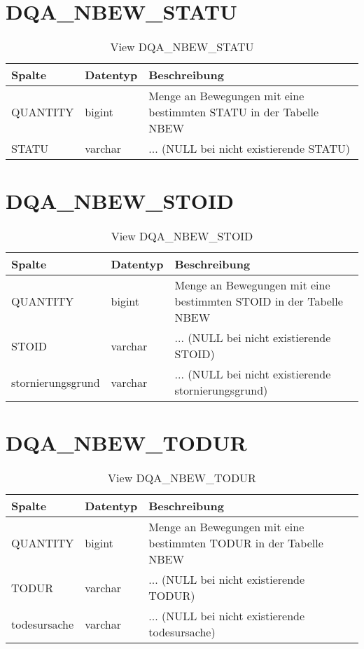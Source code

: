   \section{DQA\_NBEW\_STATU}

  \begin{table}[ht]
    \centering
    \caption{View DQA\_NBEW\_STATU}
    \label{tab:dqanbewstatu}
    \begin{tabular}{||l|l|p{10cm}||}
      \hline
      Spalte & Datentyp & Beschreibung \\ [0.5ex] \hline \hline
QUANTITY & bigint & Menge an Bewegungen mit eine bestimmten STATU in der Tabelle NBEW \\ \hline
STATU & varchar & ... (NULL bei nicht existierende STATU)\\ \hline
    \end{tabular}
  \end{table}
 \clearpage
  \section{DQA\_NBEW\_STOID}

  \begin{table}[ht]
    \centering
    \caption{View DQA\_NBEW\_STOID}
    \label{tab:dqanbewstoid}
    \begin{tabular}{||l|l|p{10cm}||}
      \hline
      Spalte & Datentyp & Beschreibung \\ [0.5ex] \hline \hline
QUANTITY & bigint & Menge an Bewegungen mit eine bestimmten STOID in der Tabelle NBEW \\ \hline
STOID & varchar & ... (NULL bei nicht existierende STOID)\\ \hline
stornierungsgrund & varchar & ... (NULL bei nicht existierende stornierungsgrund)\\ \hline
    \end{tabular}
  \end{table}
 \clearpage
  \section{DQA\_NBEW\_TODUR}

  \begin{table}[ht]
    \centering
    \caption{View DQA\_NBEW\_TODUR}
    \label{tab:dqanbewtodur}
    \begin{tabular}{||l|l|p{10cm}||}
      \hline
      Spalte & Datentyp & Beschreibung \\ [0.5ex] \hline \hline
QUANTITY & bigint & Menge an Bewegungen mit eine bestimmten TODUR in der Tabelle NBEW \\ \hline
TODUR & varchar & ... (NULL bei nicht existierende TODUR)\\ \hline
todesursache & varchar & ... (NULL bei nicht existierende todesursache)\\ \hline
    \end{tabular}
  \end{table}
 \clearpage
